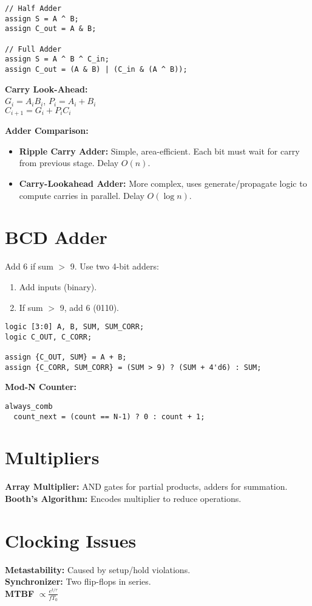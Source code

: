 \documentclass[8pt]{article}
\begin{document}
\begin{lstlisting}
// Half Adder
assign S = A ^ B;
assign C_out = A & B;

// Full Adder
assign S = A ^ B ^ C_in;
assign C_out = (A & B) | (C_in & (A ^ B));
\end{lstlisting}

\textbf{Carry Look-Ahead:} \\
$G_i = A_i B_i$, $P_i = A_i + B_i$ \\
$C_{i+1} = G_i + P_i C_i$

\textbf{Adder Comparison:}
\begin{itemize}
    \item \textbf{Ripple Carry Adder:} Simple, area-efficient. Each bit must wait for carry from previous stage. Delay $O(n)$.
    \item \textbf{Carry-Lookahead Adder:} More complex, uses generate/propagate logic to compute carries in parallel. Delay $O(\log n)$.
\end{itemize}

\section*{BCD Adder}
Add 6 if sum $>$ 9. Use two 4-bit adders:
\begin{enumerate}
    \item Add inputs (binary).
    \item If sum $>$ 9, add 6 (0110).
\end{enumerate}

\begin{lstlisting}
logic [3:0] A, B, SUM, SUM_CORR;
logic C_OUT, C_CORR;

assign {C_OUT, SUM} = A + B;
assign {C_CORR, SUM_CORR} = (SUM > 9) ? (SUM + 4'd6) : SUM;
\end{lstlisting}

\textbf{Mod-N Counter:}
\begin{lstlisting}
always_comb
  count_next = (count == N-1) ? 0 : count + 1;
\end{lstlisting}

\section*{Multipliers}
\textbf{Array Multiplier:} AND gates for partial products, adders for summation. \\
\textbf{Booth's Algorithm:} Encodes multiplier to reduce operations.

\section*{Clocking Issues}
\textbf{Metastability:} Caused by setup/hold violations. \\
\textbf{Synchronizer:} Two flip-flops in series. \\
\textbf{MTBF} $\propto \frac{e^{t/\tau}}{f T_0}$
\end{document}

